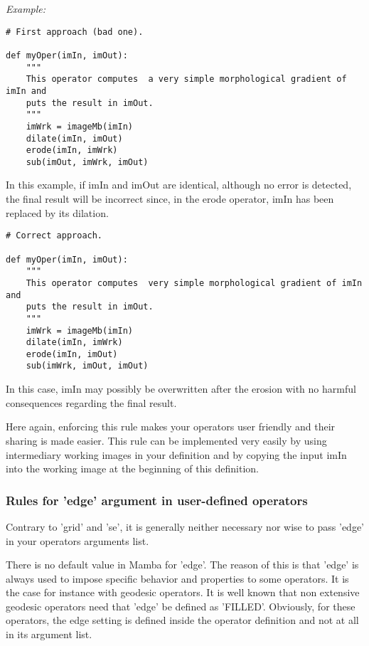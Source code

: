 \documentclass[a4paper,10pt,oneside]{article}
\begin{document}
\emph{Example:}

\lstset{language=Python}
\begin{lstlisting}
# First approach (bad one).

def myOper(imIn, imOut):
    """
    This operator computes  a very simple morphological gradient of imIn and
    puts the result in imOut.
    """
    imWrk = imageMb(imIn)
    dilate(imIn, imOut)
    erode(imIn, imWrk)
    sub(imOut, imWrk, imOut)
\end{lstlisting}

In this example, if imIn and imOut are identical, although no error is detected, 
the final result will be incorrect since, in the erode operator, imIn has been 
replaced by its dilation.

\lstset{language=Python}
\begin{lstlisting}
# Correct approach.

def myOper(imIn, imOut):
    """
    This operator computes  very simple morphological gradient of imIn and
    puts the result in imOut.
    """
    imWrk = imageMb(imIn)
    dilate(imIn, imWrk)
    erode(imIn, imOut)
    sub(imWrk, imOut, imOut)
\end{lstlisting}

In this case, imIn may possibly be overwritten after the erosion with no harmful 
consequences regarding the final result.

Here again, enforcing this rule makes your operators user friendly and their 
sharing is made easier. This rule can be implemented very easily by using 
intermediary working images in your definition and by copying the input imIn 
into the working image at the beginning of this definition. 


\subsubsection{Rules for 'edge' argument in user-defined operators}

Contrary to 'grid' and 'se', it is generally neither necessary nor wise  to 
pass 'edge' in your operators arguments list. 

There is no default value in Mamba for 'edge'. The reason of this is that 'edge' 
is always used to impose specific behavior and properties to some operators. 
It is the case for instance with geodesic operators.  It is well known that non 
extensive geodesic operators need that 'edge' be defined as 'FILLED'. Obviously, 
for these operators, the edge setting is defined inside the operator definition 
and not at all in its argument list.
\end{document}
